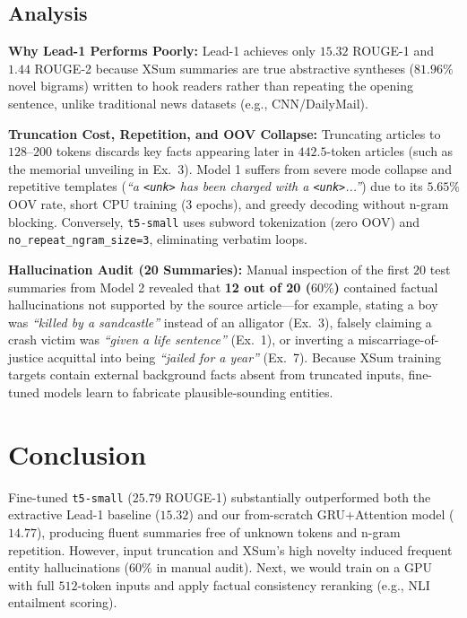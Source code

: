 \documentclass[10pt,twocolumn,a4paper]{IEEEtran}
\begin{document}
\subsection{Analysis}
\textbf{Why Lead-1 Performs Poorly:} Lead-1 achieves only $15.32$ ROUGE-1 and $1.44$ ROUGE-2 because XSum summaries are true abstractive syntheses ($81.96\%$ novel bigrams) written to hook readers rather than repeating the opening sentence, unlike traditional news datasets (e.g., CNN/DailyMail).

\textbf{Truncation Cost, Repetition, and OOV Collapse:} Truncating articles to $128$--$200$ tokens discards key facts appearing later in $442.5$-token articles (such as the memorial unveiling in Ex.\ 3). Model 1 suffers from severe mode collapse and repetitive templates (\textit{``a \texttt{<unk>} has been charged with a \texttt{<unk>}...''}) due to its $5.65\%$ OOV rate, short CPU training ($3$ epochs), and greedy decoding without n-gram blocking. Conversely, \texttt{t5-small} uses subword tokenization (zero OOV) and \texttt{no\_repeat\_ngram\_size=3}, eliminating verbatim loops.

\textbf{Hallucination Audit (20 Summaries):} Manual inspection of the first $20$ test summaries from Model 2 revealed that \textbf{12 out of 20 ($60\%$)} contained factual hallucinations not supported by the source article—for example, stating a boy was \textit{``killed by a sandcastle''} instead of an alligator (Ex.\ 3), falsely claiming a crash victim was \textit{``given a life sentence''} (Ex.\ 1), or inverting a miscarriage-of-justice acquittal into being \textit{``jailed for a year''} (Ex.\ 7). Because XSum training targets contain external background facts absent from truncated inputs, fine-tuned models learn to fabricate plausible-sounding entities.

\section{Conclusion}
Fine-tuned \texttt{t5-small} ($25.79$ ROUGE-1) substantially outperformed both the extractive Lead-1 baseline ($15.32$) and our from-scratch GRU+Attention model ($14.77$), producing fluent summaries free of unknown tokens and n-gram repetition. However, input truncation and XSum's high novelty induced frequent entity hallucinations ($60\%$ in manual audit). Next, we would train on a GPU with full $512$-token inputs and apply factual consistency reranking (e.g., NLI entailment scoring).

\newpage
\end{document}
